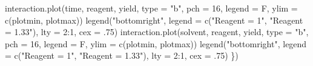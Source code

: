 \documentclass[
]{book}
\newenvironment{Shaded}{\begin{snugshade}}{\end{snugshade}}
\newcommand{\AttributeTok}[1]{\textcolor[rgb]{0.77,0.63,0.00}{#1}}
\newcommand{\DecValTok}[1]{\textcolor[rgb]{0.00,0.00,0.81}{#1}}
\newcommand{\FunctionTok}[1]{\textcolor[rgb]{0.00,0.00,0.00}{#1}}
\newcommand{\NormalTok}[1]{#1}
\newcommand{\SpecialCharTok}[1]{\textcolor[rgb]{0.00,0.00,0.00}{#1}}
\newcommand{\StringTok}[1]{\textcolor[rgb]{0.31,0.60,0.02}{#1}}
\theoremstyle{definition}
\theoremstyle{definition}
\theoremstyle{definition}
\theoremstyle{definition}
\theoremstyle{remark}
\begin{document}
\begin{Shaded}
\begin{Highlighting}[]
  \FunctionTok{interaction.plot}\NormalTok{(time, reagent, yield, }\AttributeTok{type =} \StringTok{"b"}\NormalTok{, }\AttributeTok{pch =} \DecValTok{16}\NormalTok{, }\AttributeTok{legend =}\NormalTok{ F, }
                   \AttributeTok{ylim =} \FunctionTok{c}\NormalTok{(plotmin, plotmax))}
  \FunctionTok{legend}\NormalTok{(}\StringTok{"bottomright"}\NormalTok{, }\AttributeTok{legend =} \FunctionTok{c}\NormalTok{(}\StringTok{"Reagent = 1"}\NormalTok{, }\StringTok{"Reagent = 1.33"}\NormalTok{), }\AttributeTok{lty =} \DecValTok{2}\SpecialCharTok{:}\DecValTok{1}\NormalTok{, }\AttributeTok{cex =}\NormalTok{ .}\DecValTok{75}\NormalTok{)}
  \FunctionTok{interaction.plot}\NormalTok{(solvent, reagent, yield, }\AttributeTok{type =} \StringTok{"b"}\NormalTok{, }\AttributeTok{pch =} \DecValTok{16}\NormalTok{, }\AttributeTok{legend =}\NormalTok{ F, }
                   \AttributeTok{ylim =} \FunctionTok{c}\NormalTok{(plotmin, plotmax))}
  \FunctionTok{legend}\NormalTok{(}\StringTok{"bottomright"}\NormalTok{, }\AttributeTok{legend =} \FunctionTok{c}\NormalTok{(}\StringTok{"Reagent = 1"}\NormalTok{, }\StringTok{"Reagent = 1.33"}\NormalTok{), }\AttributeTok{lty =} \DecValTok{2}\SpecialCharTok{:}\DecValTok{1}\NormalTok{, }\AttributeTok{cex =}\NormalTok{ .}\DecValTok{75}\NormalTok{)}
\NormalTok{\})}
\end{Highlighting}
\end{Shaded}
\end{document}
